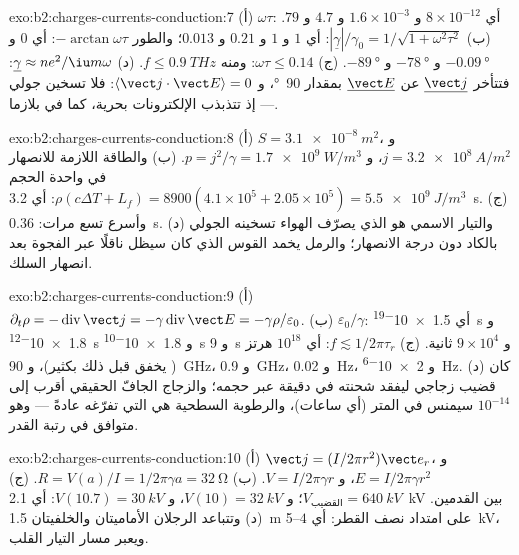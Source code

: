 \begin{solution}{exo:b2:charges-currents-conduction:7}
(أ) $\omega\tau$: أي $8 \times 10^{-12}$ و $1.6 \times 10^{-3}$ و $4.7$ و $79$. (ب) $|\underline\gamma|/\gamma_0 =
1/\sqrt{1 + \omega^2\tau^2}$: أي $1$ و $1$ و $0.21$ و $0.013$؛ والطور $-\arctan\omega\tau$: أي $0$
و $-\qty{0.09}{\degree}$ و $-\qty{78}{\degree}$ و $-\qty{89}{\degree}$. (ج) $\omega\tau \le 0.14$: ومنه $f \le
\qty{0.9}{THz}$. (د) $\underline\gamma \approx ne^2/\iu m\omega$: فتتأخر $\underline{\vect j}$ عن
$\underline{\vect E}$ بمقدار \qty{90}{\degree}، و $\langle\vect j\cdot\vect E\rangle = 0$: فلا تسخين
جولي --- إذ تتذبذب الإلكترونات بحرية، كما في بلازما.
\end{solution}

\begin{solution}{exo:b2:charges-currents-conduction:8}
(أ) $S = \qty{3.1e-8}{m^2}$، و $j = \qty{3.2e8}{A/m^2}$، و $p = j^2/\gamma = \qty{1.7e9}{W/m^3}$.
(ب) والطاقة اللازمة للانصهار في واحدة الحجم $\rho(c\Delta T + L_f) = 8900(4.1 \times 10^5 + 2.05 \times
10^5) = \qty{5.5e9}{J/m^3}$: أي \qty{3.2}{s}. (ج) وأسرع تسع مرات: \qty{0.36}{s}. (د) والتيار
الاسمي هو الذي يصرّف الهواء تسخينه الجولي بالكاد
دون درجة الانصهار؛ والرمل يخمد القوس الذي كان
سيظل ناقلًا عبر الفجوة بعد انصهار السلك.
\end{solution}

\begin{solution}{exo:b2:charges-currents-conduction:9}
(أ) $\partial_t\rho = -\operatorname{div}\vect j = -\gamma\operatorname{div}\vect E = -\gamma\rho/
\varepsilon_0$. (ب) $\varepsilon_0/\gamma$: أي \qty{1.5e-19}{s} و \qty{1.8e-12}{s} و \qty{1.8e-10}{s}
و \qty{9}{s} و $9 \times 10^4$ ثانية. (ج) $f \lesssim 1/2\pi\tau_r$: أي $10^{18}$ هرتز (
يخفق قبل ذلك بكثير)، و \qty{90}{GHz}، و \qty{0.9}{GHz}، و \qty{0.02}{Hz}، و \qty{2e-6}{Hz}. (د)
كان قضيب زجاجي ليفقد شحنته في دقيقة عبر حجمه؛
والزجاج الجافّ الحقيقي أقرب إلى $10^{-14}$ سيمنس في المتر (أي ساعات)، والرطوبة
السطحية هي التي تفرّغه عادةً --- وهو متوافق في رتبة
القدر.
\end{solution}

\begin{solution}{exo:b2:charges-currents-conduction:10}
(أ) $\vect j = (I/2\pi r^2)\vect e_r$، و $E = I/2\pi\gamma r^2$، و $V = I/2\pi\gamma r$. (ب) $R = V(a)
/I = 1/2\pi\gamma a = \qty{32}{\ohm}$. (ج) $V_{\text{القضيب}} = \qty{640}{kV}$؛ و $V(10) = \qty{32}{kV}$،
و $V(10.7) = \qty{30}{kV}$: أي \qty{2.1}{kV} بين القدمين. (د) وتتباعد الرجلان الأماميتان
والخلفيتان \qty{1.5}{m} على امتداد نصف القطر: أي $4$--\qty{5}{kV}، ويعبر مسار
التيار القلب.
\end{solution}

